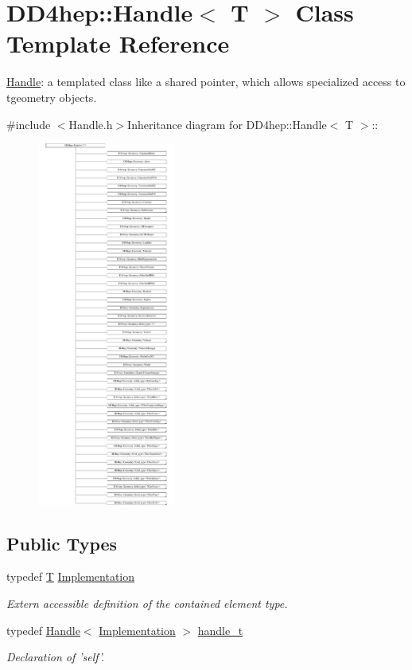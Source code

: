 \hypertarget{class_d_d4hep_1_1_handle}{
\section{DD4hep::Handle$<$ T $>$ Class Template Reference}
\label{class_d_d4hep_1_1_handle}
}


\hyperlink{class_d_d4hep_1_1_handle}{Handle}: a templated class like a shared pointer, which allows specialized access to tgeometry objects.  


{\ttfamily \#include $<$Handle.h$>$}Inheritance diagram for DD4hep::Handle$<$ T $>$::\begin{figure}[H]
\begin{center}
\leavevmode
\includegraphics[height=12cm]{class_d_d4hep_1_1_handle}
\end{center}
\end{figure}
\subsection*{Public Types}
\begin{DoxyCompactItemize}
\item 
typedef \hyperlink{class_t}{T} \hyperlink{class_d_d4hep_1_1_handle_ad7ff728a25806079516b8965b9113f1a}{Implementation}
\begin{DoxyCompactList}\small\item\em Extern accessible definition of the contained element type. \item\end{DoxyCompactList}\item 
typedef \hyperlink{class_d_d4hep_1_1_handle}{Handle}$<$ \hyperlink{class_t}{Implementation} $>$ \hyperlink{class_d_d4hep_1_1_handle_a3d9df9d5b334e984b288ffbabcacb564}{handle\_\-t}
\begin{DoxyCompactList}\small\item\em Declaration of 'self'. \item\end{DoxyCompactList}\end{DoxyCompactItemize}
